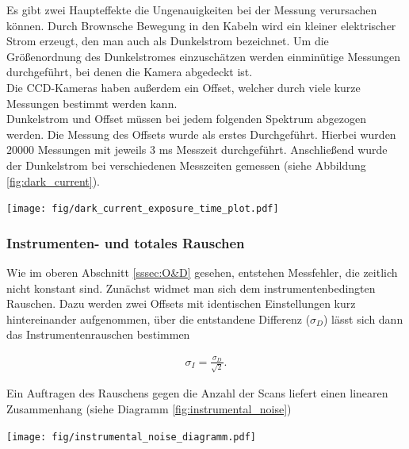 \documentclass[12pt, a4paper, bibliography=totoc]{scrartcl}
\begin{document}
\begin{multicols}{2}
Es gibt zwei Haupteffekte die Ungenauigkeiten bei der Messung verursachen können.
Durch Brownsche Bewegung in den Kabeln wird ein kleiner elektrischer Strom erzeugt, den man auch als Dunkelstrom bezeichnet.
Um die Größenordnung des Dunkelstromes einzuschätzen werden einminütige Messungen durchgeführt, bei denen die Kamera abgedeckt ist.\\
Die CCD-Kameras haben außerdem ein Offset, welcher durch viele kurze Messungen bestimmt werden kann.\\
Dunkelstrom und Offset müssen bei jedem folgenden Spektrum abgezogen werden.
Die Messung des Offsets wurde als erstes Durchgeführt. 
Hierbei wurden $20000$ Messungen mit jeweils $3$ \si{ms} Messzeit durchgeführt.
Anschließend wurde der Dunkelstrom bei verschiedenen Messzeiten gemessen (siehe Abbildung \ref{fig:dark_current}).
    
\begin{center}
	\texttt{[image: fig/dark\_current\_exposure\_time\_plot.pdf]}
	\label{fig:dark_current}
\end{center}

\subsubsection{Instrumenten- und totales Rauschen}\label{sssec:instrumental_total_noise}

Wie im oberen Abschnitt \ref{sssec:O&D} gesehen, entstehen Messfehler, die zeitlich nicht konstant sind. Zunächst widmet man sich dem instrumentenbedingten Rauschen.
Dazu werden zwei Offsets mit identischen Einstellungen kurz hintereinander aufgenommen, über die entstandene Differenz ($\sigma_D$) lässt sich dann das Instrumentenrauschen bestimmen 

\begin{align}
\sigma_{I} = \frac{\sigma_D}{\sqrt{2}}.\label{eq:instrumental_noise}
\end{align}

Ein Auftragen des Rauschens gegen die Anzahl der Scans liefert einen linearen Zusammenhang (siehe Diagramm \ref{fig:instrumental_noise})

\begin{center}
	\texttt{[image: fig/instrumental\_noise\_diagramm.pdf]}
	\label{fig:instrumental_noise}
\end{center}  


\end{multicols}
\end{document}

